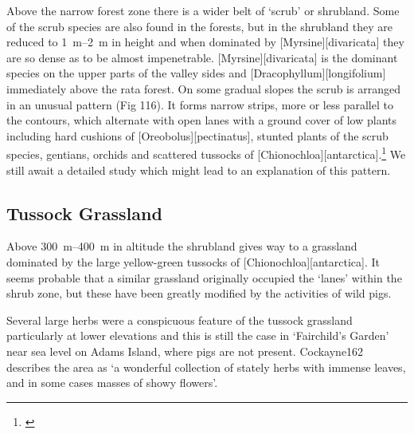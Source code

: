 Above the narrow forest zone there is a wider belt of `scrub' or shrubland.
Some of the scrub species are also found in the forests, but in the shrubland they are reduced to \SIrange{1}{2}{\metre} in height and when dominated by [Myrsine][divaricata] they are so dense as to be almost impenetrable. [Myrsine][divaricata] is the dominant species on the upper parts of the valley sides and [Dracophyllum][longifolium] immediately above the rata forest.
On some gradual slopes the scrub is arranged in an unusual pattern (Fig 116).
It forms narrow strips, more or less parallel to the contours, which alternate with open lanes with a ground cover of low plants including hard cushions of [Oreobolus][pectinatus], stunted plants of the scrub species, gentians, orchids and scattered tussocks of [Chionochloa][antarctica].\footnote{\cite{godley1965notes}}
We still await a detailed study which might lead to an explanation of this pattern.

\subsection{Tussock Grassland}

Above \SIrange{300}{400}{\metre} in altitude the shrubland gives way to a grassland dominated by the large yellow-green tussocks of [Chionochloa][antarctica].
It seems probable that a similar grassland originally occupied the `lanes' within the shrub zone, but these have been greatly modified by the activities of wild pigs.

Several large herbs were a conspicuous feature of the tussock grassland particularly at lower elevations and this is still the case in `Fairchild's Garden' near sea level on Adams Island, where pigs are not present.
Cockayne162 describes the area as `a wonderful collection of stately herbs with immense leaves, and in some cases masses of showy flowers'.


